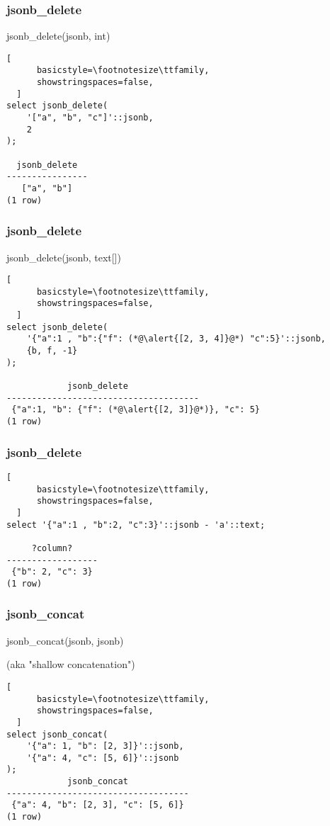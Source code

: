 \documentclass[14pt, compress]{beamer}
\begin{document}
\begin{frame}[fragile]
  \frametitle{jsonb\_delete}

  jsonb\_delete(jsonb, int)

  \begin{lstlisting}[
      basicstyle=\footnotesize\ttfamily,
      showstringspaces=false,
  ]
select jsonb_delete(
    '["a", "b", "c"]'::jsonb,
    2
);

  jsonb_delete   
----------------
   ["a", "b"]
(1 row)

  \end{lstlisting}
\end{frame}

\begin{frame}[fragile]
  \frametitle{jsonb\_delete}

  jsonb\_delete(jsonb, text[])

  \begin{lstlisting}[
      basicstyle=\footnotesize\ttfamily,
      showstringspaces=false,
  ]
select jsonb_delete(
    '{"a":1 , "b":{"f": (*@\alert{[2, 3, 4]}@*) "c":5}'::jsonb,
    {b, f, -1}
);

            jsonb_delete   
--------------------------------------
 {"a":1, "b": {"f": (*@\alert{[2, 3]}@*)}, "c": 5}
(1 row)

  \end{lstlisting}
\end{frame}

\begin{frame}[fragile]
  \frametitle{jsonb\_delete}

  \begin{lstlisting}[
      basicstyle=\footnotesize\ttfamily,
      showstringspaces=false,
  ]
select '{"a":1 , "b":2, "c":3}'::jsonb - 'a'::text;

     ?column?     
------------------
 {"b": 2, "c": 3}
(1 row)

  \end{lstlisting}
\end{frame}

\begin{frame}[fragile]
\frametitle{jsonb\_concat}
  jsonb\_concat(jsonb, jsonb)

  (aka "shallow concatenation")

  \begin{lstlisting}[
      basicstyle=\footnotesize\ttfamily,
      showstringspaces=false,
  ]
select jsonb_concat(
    '{"a": 1, "b": [2, 3]}'::jsonb,
    '{"a": 4, "c": [5, 6]}'::jsonb
);
            jsonb_concat            
------------------------------------
 {"a": 4, "b": [2, 3], "c": [5, 6]}
(1 row)

  \end{lstlisting}
\end{frame}
\end{document}
